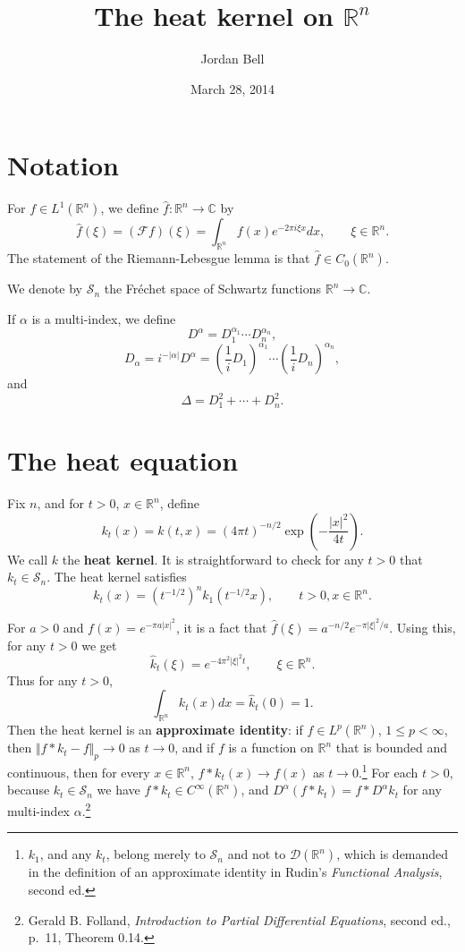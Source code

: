 \documentclass{article}
\newcommand{\norm}[1]{\Vert #1 \Vert}
\begin{document}
\title{The heat kernel on $\mathbb{R}^n$}
\author{Jordan Bell}
\date{March 28, 2014}


\maketitle

\section{Notation}
For $f \in L^1(\mathbb{R}^n)$, we define $\hat{f}:\mathbb{R}^n \to \mathbb{C}$ by 
\[
\hat{f}(\xi) =(\mathscr{F}f)(\xi)= \int_{\mathbb{R}^n} f(x) e^{-2\pi i \xi x} dx, \qquad \xi \in \mathbb{R}^n.
\]
The statement of the Riemann-Lebesgue lemma is that $\hat{f} \in C_0(\mathbb{R}^n)$. 

We denote by $\mathscr{S}_n$ the Fr\'echet space of Schwartz functions $\mathbb{R}^n \to \mathbb{C}$.

If $\alpha$ is a multi-index, we define
\[
D^\alpha = D_1^{\alpha_1} \cdots D_n^{\alpha_n},
\]
\[
D_\alpha = i^{-|\alpha|} D^\alpha = \left(\frac{1}{i} D_1\right)^{\alpha_1} \cdots \left( \frac{1}{i} D_n\right)^{\alpha_n},
\]
and
\[
\Delta = D_1^2 + \cdots + D_n^2.
\]


\section{The heat equation}
Fix $n$, 
and for $t>0$, $x \in \mathbb{R}^n$, define
\[
k_t(x) =k(t,x)= (4\pi t)^{-n/2} \exp\left(-\frac{|x|^2}{4t}\right).
\]
We call $k$ the \textbf{heat kernel}.
It is straightforward to check for any $t>0$ that $k_t \in \mathscr{S}_n$.
The heat kernel satisfies
\[
k_t(x)=(t^{-1/2})^n k_1(t^{-1/2}x), \qquad t>0, x\in \mathbb{R}^n.
\]

For $a>0$ and $f(x)=e^{-\pi a|x|^2}$, it is a fact that $\hat{f}(\xi)=a^{-n/2} e^{-\pi |\xi|^2/a}$. Using this, for any $t>0$ we
get
\[
\hat{k}_t(\xi)=e^{-4\pi^2 |\xi|^2 t}, \qquad \xi \in \mathbb{R}^n.
\]
Thus for any $t>0$,
\[
\int_{\mathbb{R}^n} k_t(x) dx = \hat{k}_t(0)=1.
\]
Then the heat kernel is an \textbf{approximate identity}: if $f \in L^p(\mathbb{R}^n)$, $1 \leq p < \infty$, then 
$\norm{f*k_t - f}_p \to 0$ as $t \to 0$, and if $f$ is a function on $\mathbb{R}^n$ that is bounded and continuous, then for every
$x \in \mathbb{R}^n$, $f*k_t(x) \to f(x)$ as $t \to 0$.\footnote{$k_1$, and any $k_t$, belong merely to $\mathscr{S}_n$ and not to
$\mathscr{D}(\mathbb{R}^n)$, which is demanded in the definition of an approximate identity in Rudin's {\em Functional Analysis},
second ed.} For each $t>0$, because $k_t \in \mathscr{S}_n$ we have $f* k_t \in C^\infty(\mathbb{R}^n)$,
and $D^\alpha(f*k_t)=f*D^\alpha k_t$ for any multi-index $\alpha$.\footnote{Gerald B. Folland, {\em Introduction to Partial Differential Equations}, second ed.,
p.~11, Theorem 0.14.}
\end{document}
